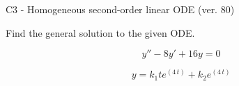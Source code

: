 \begin{exercise}
  \begin{exerciseTitle}C3 - Homogeneous second-order linear ODE (ver. 80)\end{exerciseTitle}
  \begin{exerciseStatement}
    
Find the general solution to the given ODE.

    
\[y''-8y'+16y = 0\]

  \end{exerciseStatement}
  \begin{exerciseAnswer}
    
\[y= k_{1} t e^{\left(4 \, t\right)} + k_{2} e^{\left(4 \, t\right)}\]

  \end{exerciseAnswer}
\end{exercise}